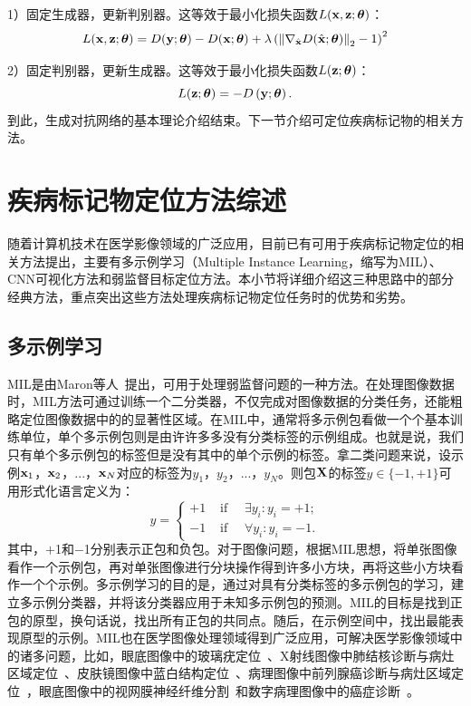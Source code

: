 1）固定生成器，更新判别器。这等效于最小化损失函数$L(\mathbf{x},\mathbf{z};\mbox{\boldmath $\theta$})$：
\begin{equation}
\begin{aligned}
	L(\mathbf{x},\mathbf{z};\mbox{\boldmath $\theta$})=D({{\mathbf{y}}};\mbox{\boldmath $\theta$})-D({\mathbf{x}};\mbox{\boldmath $\theta$})+\lambda\left(\left\|\nabla_{\hat{\mathbf{x}}} D(\hat{\mathbf{x}};\mbox{\boldmath $\theta$})\right\|_{2}-1\right)^{2}
\end{aligned}
\end{equation}

2）固定判别器，更新生成器。这等效于最小化损失函数$L(\mathbf{z};\mbox{\boldmath $\theta$})$：
\begin{equation}
	L(\mathbf{z};\mbox{\boldmath $\theta$})=-D\left(\mathbf{y};\mbox{\boldmath $\theta$}\right).
\end{equation}
\noindent 到此，生成对抗网络的基本理论介绍结束。下一节介绍可定位疾病标记物的相关方法。
\section{疾病标记物定位方法综述}\label{sec:related_work}
随着计算机技术在医学影像领域的广泛应用，目前已有可用于疾病标记物定位的相关方法提出，主要有多示例学习（Multiple Instance Learning，缩写为MIL）、CNN可视化方法和弱监督目标定位方法。本小节将详细介绍这三种思路中的部分经典方法，重点突出这些方法处理疾病标记物定位任务时的优势和劣势。
\subsection{多示例学习}
MIL是由Maron等人~\cite{maron1998framework}提出，可用于处理弱监督问题的一种方法。在处理图像数据时，MIL方法可通过训练一个二分类器，不仅完成对图像数据的分类任务，还能粗略定位图像数据中的的显著性区域。在MIL中，通常将多示例包看做一个个基本训练单位，单个多示例包则是由许许多多没有分类标签的示例组成。也就是说，我们只有单个多示例包的标签但是没有其中的单个示例的标签。拿二类问题来说，设示例${\mathbf{x}_1}$，$\mathbf{x}_2$，...，$\mathbf{x}_N$对应的标签为${y_1}$，${y_2}$，...，${y_N}$。则包$\mathbf{X}$的标签$y\in \{-1,+1\}$可用形式化语言定义为：
\begin{equation}
y=\left\{\begin{array}{ll}
{+1} & {\text { if } \quad \exists {y}_{i}: {y}_{i}=+1;} \\
{-1} & {\text { if } \quad \forall {y}_{i}: {y}_{i}=-1.}
\end{array}\right.
\end{equation}
其中，$+$1和$-$1分别表示正包和负包。对于图像问题，根据MIL思想，将单张图像看作一个示例包，再对单张图像进行分块操作得到许多小方块，再将这些小方块看作一个个示例。多示例学习的目的是，通过对具有分类标签的多示例包的学习，建立多示例分类器，并将该分类器应用于未知多示例包的预测。MIL的目标是找到正包的原型，换句话说，找出所有正包的共同点。随后，在示例空间中，找出最能表现原型的示例。MIL也在医学图像处理领域得到广泛应用，可解决医学影像领域中的诸多问题，比如，眼底图像中的玻璃疣定位~\cite{lu2015effective}、X射线图像中肺结核诊断与病灶区域定位~\cite{melendez2014novel}、皮肤镜图像中蓝白结构定位~\cite{madooei2018learning}、病理图像中前列腺癌诊断与病灶区域定位~\cite{campanella2018terabyte}，眼底图像中的视网膜神经纤维分割~\cite{manivannan2017subcategory}和数字病理图像中的癌症诊断~\cite{kandemir2014empowering}。

